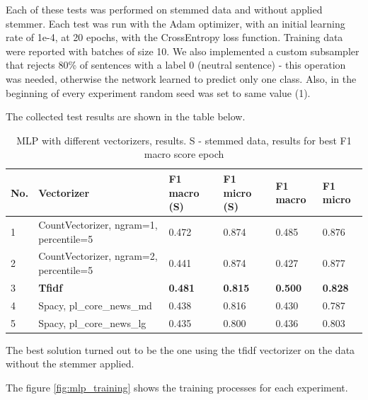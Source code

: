 \documentclass[a4paper]{article}
\begin{document}
Each of these tests was performed on stemmed data and without applied stemmer. Each test was run with the Adam optimizer, with an initial learning rate of 1e-4, at 20 epochs, with the CrossEntropy loss function. Training data were reported with batches of size 10. We also implemented a custom subsampler that rejects 80\% of sentences with a label 0 (neutral sentence) - this operation was needed, otherwise the network learned to predict only one class. Also, in the beginning of every experiment random seed was set to same value (1).

The collected test results are shown in the table below.

\begin{table}[h]
\centering
\begin{tabular}{|l|l|l|l|l|l|}
\hline
No. & Vectorizer                             & F1 macro (S) & F1 micro (S) & F1 macro & F1 micro \\ \hline
1   & CountVectorizer, ngram=1, percentile=5 & 0.472        & 0.874        & 0.485    & 0.876    \\ \hline
2   & CountVectorizer, ngram=2, percentile=5 & 0.441        & 0.874        & 0.427    & 0.877    \\ \hline
3   & \textbf{Tfidf}                                  & \textbf{0.481}        & \textbf{0.815}        & \textbf{0.500}    & \textbf{0.828}    \\ \hline
4   & Spacy, pl\_core\_news\_md              & 0.438        & 0.816        & 0.430    & 0.787    \\ \hline
5   & Spacy, pl\_core\_news\_lg              & 0.435        & 0.800        & 0.436    & 0.803    \\ \hline
\end{tabular}
\caption{MLP with different vectorizers, results. S - stemmed data, results for best F1 macro score epoch}
\label{tab:mlp_results}
\end{table}

The best solution turned out to be the one using the tfidf vectorizer on the data without the stemmer applied.

The figure \ref{fig:mlp_training} shows the training processes for each experiment.  
\end{document}
